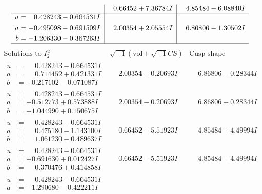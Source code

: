 \documentclass[1p]{elsarticle_modified}
\theoremstyle{definition}
\newcommand{\I}{\sqrt{-1}}
\begin{document}
$$\begin{array}{c|c|c}
 & \phantom{-}0.66452 + 7.36784 I & \phantom{-}4.85484 - 6.08840 I \\ \hline\begin{aligned}
u &= \phantom{-}0.428243 - 0.664531 I \\
a &= -0.495098 - 0.691509 I \\
b &= -1.206330 - 0.367263 I\end{aligned}
 & \phantom{-}2.00354 + 2.05554 I & \phantom{-}6.86806 - 1.30502 I\\
 \hline 
 \end{array}$$\newpage$$\begin{array}{c|c|c}  
\text{Solutions to }I^u_{2}& \I (\text{vol} + \sqrt{-1}CS) & \text{Cusp shape}\\
 \hline 
\begin{aligned}
u &= \phantom{-}0.428243 - 0.664531 I \\
a &= \phantom{-}0.714452 + 0.421331 I \\
b &= -0.217102 - 0.071087 I\end{aligned}
 & \phantom{-}2.00354 - 0.20693 I & \phantom{-}6.86806 - 0.28344 I \\ \hline\begin{aligned}
u &= \phantom{-}0.428243 - 0.664531 I \\
a &= -0.512773 + 0.573888 I \\
b &= -1.044990 + 0.150675 I\end{aligned}
 & \phantom{-}2.00354 - 0.20693 I & \phantom{-}6.86806 - 0.28344 I \\ \hline\begin{aligned}
u &= \phantom{-}0.428243 - 0.664531 I \\
a &= \phantom{-}0.475180 - 1.143100 I \\
b &= \phantom{-}1.061230 - 0.489637 I\end{aligned}
 & \phantom{-}0.66452 - 5.51923 I & \phantom{-}4.85484 + 4.49994 I \\ \hline\begin{aligned}
u &= \phantom{-}0.428243 - 0.664531 I \\
a &= -0.691630 + 0.012427 I \\
b &= \phantom{-}0.370476 + 0.414858 I\end{aligned}
 & \phantom{-}0.66452 - 5.51923 I & \phantom{-}4.85484 + 4.49994 I \\ \hline\begin{aligned}
u &= \phantom{-}0.428243 - 0.664531 I \\
a &= -1.290680 - 0.422211 I \\

\end{aligned}
\end{array}$$
\end{document}
